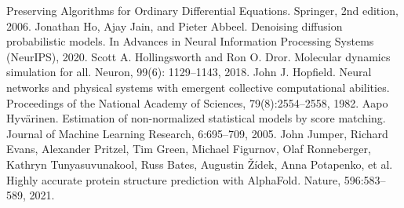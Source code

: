 \documentclass{article}
\begin{document}
Preserving Algorithms for Ordinary Differential Equations. Springer, 2nd edition, 2006.
Jonathan Ho, Ajay Jain, and Pieter Abbeel. Denoising diffusion probabilistic models. In Advances
in Neural Information Processing Systems (NeurIPS), 2020.
Scott A. Hollingsworth and Ron O. Dror. Molecular dynamics simulation for all. Neuron, 99(6):
1129--1143, 2018.
John J. Hopfield. Neural networks and physical systems with emergent collective computational
abilities. Proceedings of the National Academy of Sciences, 79(8):2554--2558, 1982.
Aapo Hyv\"arinen. Estimation of non-normalized statistical models by score matching. Journal of
Machine Learning Research, 6:695--709, 2005.
John Jumper, Richard Evans, Alexander Pritzel, Tim Green, Michael Figurnov, Olaf Ronneberger,
Kathryn Tunyasuvunakool, Russ Bates, Augustin \v{Z}\'idek, Anna Potapenko, et al. Highly accurate
protein structure prediction with AlphaFold. Nature, 596:583--589, 2021.
\clearpage

\end{document}

